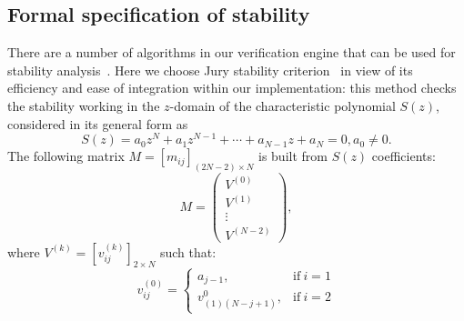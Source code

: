 \documentclass[twocolumn]{autart}    %
\begin{document}
\subsection{Formal specification of stability} 
\label{ssec:stabspecification}


  There are a number of algorithms in our verification engine that can
  be used for stability analysis~\cite{daes20161, Bessa16}.
Here we choose Jury stability criterion~\cite{astrom1997computer} in view of its efficiency 
and ease of integration within our implementation: 
this method checks the stability working in the $z$-domain of the characteristic polynomial $S(z)$,  
%
%
considered in its general form as 
%
\begin{equation*}
S(z) = a_0z^N+a_1z^{N-1}+\cdots+a_{N-1}z+a_N=0, a_0\neq0. 
\end{equation*}
The following matrix
$M = [m_{ij}]_{(2N-2)\times N}$ is built from $S(z)$ coefficients:
%
$$
M=\left( 
\begin{array}{c}
V^{(0)}\\
V^{(1)}\\
\vdots\\
V^{(N-2)}
\end{array}
\right), 
$$
%
where $V^{(k)} = [v^{(k)}_{ij} ]_{2\times N}$ such that:
%
$$
v_{ij}^{(0)}=\left\{
\begin{array}{ll}
a_{j-1}, & \mbox{if}~i=1\\
v_{(1)(N-j+1)}^{0},&\mbox{if}~i=2
\end{array}
\right.
$$
\end{document}
